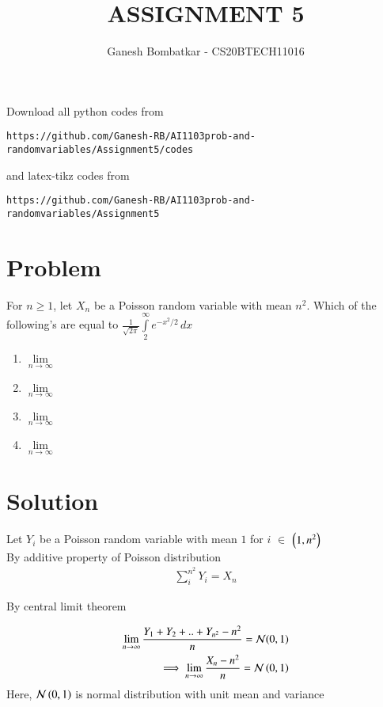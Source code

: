 \documentclass[journal,12pt,twocolumn]{IEEEtran}
\begin{document}
\title{ASSIGNMENT 5}
\author{Ganesh Bombatkar - CS20BTECH11016}
\maketitle
\newpage
\bigskip
\renewcommand{\thefigure}{\theenumi}
\renewcommand{\thetable}{\theenumi}
Download all python codes from 
\begin{lstlisting}
https://github.com/Ganesh-RB/AI1103prob-and-randomvariables/Assignment5/codes
\end{lstlisting}
%
and latex-tikz codes from 
%
\begin{lstlisting}
https://github.com/Ganesh-RB/AI1103prob-and-randomvariables/Assignment5
\end{lstlisting}
\section{Problem}
For $n \geq 1$, let $X_n$ be a Poisson random  variable with mean $n^2$.
 Which of the following's are equal to
 $\displaystyle{\frac{1}{\sqrt{2\pi}} \int \limits_2^{\infty} e^{-x^2/2}\,dx}$
\begin{enumerate}
    \item $\lim \limits_{n \to \infty} $ 
    \item $\lim \limits_{n \to \infty} $ 
    \item $\lim \limits_{n \to \infty} $ 
    \item $\lim \limits_{n \to \infty} $ 
\end{enumerate}


\section{Solution}
Let $Y_i$ be a Poisson random variable with mean $1$ for $i$ $\in$ $\left(1,n^2\right)$
\\[2ex]By additive property of Poisson distribution
\begin{align}
   { \sum \limits_{i}^{n^2} Y_i = X_n   }  
\end{align}

By central limit theorem 

\begin{align}
    \lim  \limits_{n \to \infty} \frac{Y_1+Y_2+..+Y_{n^2} - n^2}{n} = \mathcal{N}(0,1)
    \\ \implies \lim  \limits_{n\to \infty} \frac{X_n-n^2}{n} = \mathcal{N}\left(0,1\right)
\end{align}
Here, $\mathcal{N}\left(0,1\right)$ is normal distribution with unit mean and variance
\end{document}
